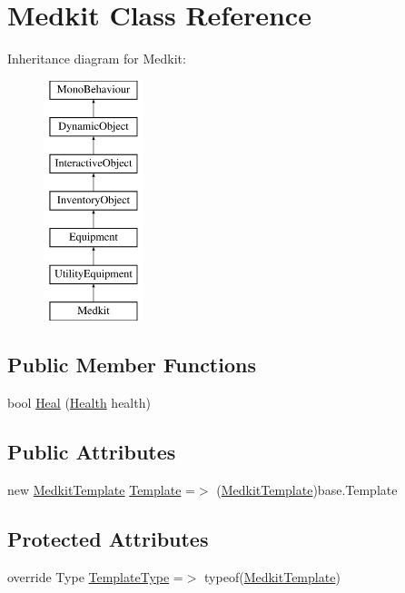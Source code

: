 \hypertarget{class_medkit}{}\section{Medkit Class Reference}
\label{class_medkit}
Inheritance diagram for Medkit\+:\begin{figure}[H]
\begin{center}
\leavevmode
\includegraphics[height=7.000000cm]{class_medkit}
\end{center}
\end{figure}
\subsection*{Public Member Functions}
\begin{DoxyCompactItemize}
\item 
bool \mbox{\hyperlink{class_medkit_acce3562cfef5e560401f38e2d1e90be0}{Heal}} (\mbox{\hyperlink{class_health}{Health}} health)
\end{DoxyCompactItemize}
\subsection*{Public Attributes}
\begin{DoxyCompactItemize}
\item 
new \mbox{\hyperlink{class_medkit_template}{Medkit\+Template}} \mbox{\hyperlink{class_medkit_a8b0cad26868935be56d6fffbb7015e07}{Template}} =$>$ (\mbox{\hyperlink{class_medkit_template}{Medkit\+Template}})base.\+Template
\end{DoxyCompactItemize}
\subsection*{Protected Attributes}
\begin{DoxyCompactItemize}
\item 
override Type \mbox{\hyperlink{class_medkit_ae9ac0491aaac1e29888088fc9d2278ee}{Template\+Type}} =$>$ typeof(\mbox{\hyperlink{class_medkit_template}{Medkit\+Template}})
\end{DoxyCompactItemize}
